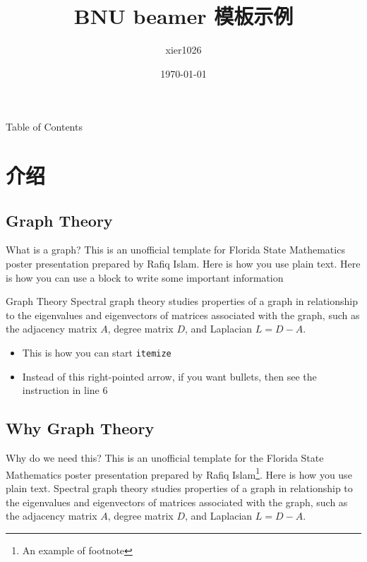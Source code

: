 \documentclass{beamer}
\title[BNU 模板]{BNU beamer 模板示例}
\author[xier]{xier1026}
\institute{Beijing Normal University}
\date{\today}
\begin{document}
\maketitle

\begin{frame}{Table of Contents}
\tableofcontents[subsectionstyle=hide, sectionstyle=show]
\end{frame}
\section{介绍}
\subsection{Graph Theory}
\begin{frame}{What is a graph?}
    This is an unofficial template for Florida State Mathematics poster presentation prepared by Rafiq 
    Islam\cite{bnumathposter25}. Here is how you use plain text. Here is how you can use a block to write some important information \cite{bnubeamerpresent25}
    \begin{block}{Graph Theory}
        Spectral graph theory studies properties of a graph in relationship to the eigenvalues and eigenvectors of matrices associated with the graph, such as the adjacency matrix $A$, degree matrix $D$, and Laplacian $L = D - A$.
    \end{block}
   \begin{itemize}
    \item This is how you can start \texttt{itemize}
    \item Instead of this right-pointed arrow, if you want bullets, then see the instruction in line 6
\end{itemize}
\end{frame}
\subsection{Why Graph Theory}
\begin{frame}{Why do we need this?}
This is an unofficial template for the Florida State Mathematics poster presentation prepared by Rafiq Islam\footnote{An example of footnote}. Here is how you use plain text. Spectral graph theory studies properties of a graph in relationship to the eigenvalues and eigenvectors of matrices associated with the graph, such as the adjacency matrix $A$, degree matrix $D$, and Laplacian $L = D - A$.
\end{frame}
\end{document}
